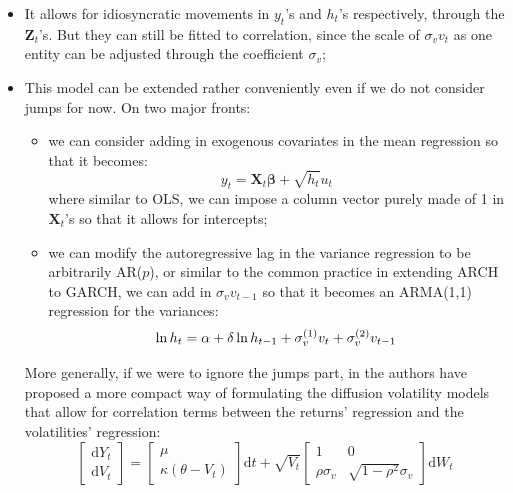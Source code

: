 \documentclass[letterpaper]{article}
\newcommand{\df}{\mathrm{d}}
\newcommand{\XX}{\mathbf{X}}
\newcommand{\ZZ}{\mathbf{Z}}
\begin{document}
\begin{itemize}
	\item It allows for idiosyncratic movements in $y_t$'s and $h_t$'s respectively, through the $\ZZ_t$'s. But they can still be fitted to correlation, since the scale of $\sigma_v v_t$ as one entity can be adjusted through the coefficient $\sigma_v$;
	\item This model can be extended rather conveniently even if we do not consider jumps for now. On two major fronts:
	\begin{itemize}
		\item we can consider adding in exogenous covariates in the mean regression so that it becomes:
		\begin{equation}
			y_t=\XX_t\bm{\beta}+\sqrt{h_t}u_t
		\end{equation}
		where similar to OLS, we can impose a column vector purely made of 1 in $\XX_t$'s so that it allows for intercepts;
		\item we can modify the autoregressive lag in the variance regression to be arbitrarily AR($p$), or similar to the common practice in extending ARCH to GARCH, we can add in $\sigma_v v_{t-1}$ so that it becomes an ARMA(1,1) regression for the variances:
		\begin{equation}
			\ln h_t=\alpha+\delta\ln h_{t-1}+\sigma_v^{(1)}v_t+\sigma_v^{(2)}v_{t-1}\\
		\end{equation}
	\end{itemize}
More generally, if we were to ignore the jumps part, in \cite{polson2003jumps} the authors have proposed a more compact way of formulating the diffusion volatility models that allow for correlation terms between the returns' regression and the volatilities' regression:
\begin{equation}\label{SVMatWithoutJumps}
	\begin{bmatrix}
	\df Y_t\\
	\df V_t
	\end{bmatrix} = 
	\begin{bmatrix}
	\mu\\
	\kappa(\theta-V_t)
	\end{bmatrix}\df t+
	\sqrt{V_t}\begin{bmatrix}
	1 & 0 \\
	\rho\sigma_v &\sqrt{1-\rho^2}\sigma_v
	\end{bmatrix}\df W_t
\end{equation}
\end{itemize}
\end{document}
